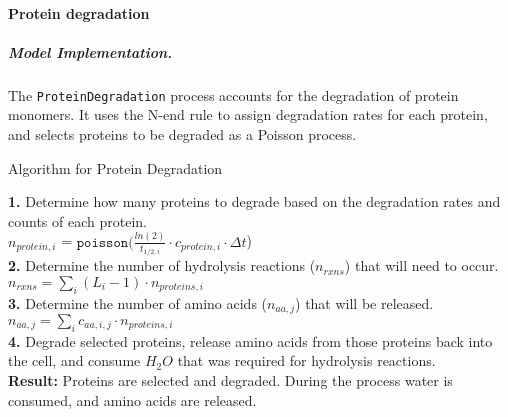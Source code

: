 \documentclass[12pt]{article}
\begin{document}
\baselineskip24pt

\paragraph{Protein degradation}

\subparagraph{Model Implementation.}
The \texttt{ProteinDegradation} process accounts for the degradation of protein monomers. It uses the N-end rule \cite{Tobias:1991tz} to assign degradation rates for each protein, and selects proteins to be degraded as a Poisson process.\\

\begin{algorithm}[H]
\caption{Algorithm for Protein Degradation}
  
    \textbf{1.} Determine how many proteins to degrade based on the degradation rates and counts of each protein. \\
    \-\hspace{1cm} $n_{protein, i}$ = $\texttt{poisson}(\frac{ln(2)}{t_{1/2,i}} \cdot c_{protein, i} \cdot \Delta t$)\\
    \textbf{2.} Determine the number of hydrolysis reactions ($n_{rxns}$) that will need to occur.\\
    \-\hspace{1cm} $n_{rxns} = \sum\limits_i (L_i - 1) \cdot n_{proteins,i}$\\
    
    \textbf{3.} Determine the number of amino acids ($n_{aa,j}$) that will be released.\\
    \-\hspace{1cm} $n_{aa,j} = \sum\limits_i c_{aa,i,j} \cdot n_{proteins,i}$\\
    \textbf{4.} Degrade selected proteins, release amino acids from those proteins back into the cell, and consume $H_2O$ that was required for hydrolysis reactions.\\
    \textbf{Result:} Proteins are selected and degraded. During the process water is consumed, and amino acids are released. 
\end{algorithm}
\end{document}
